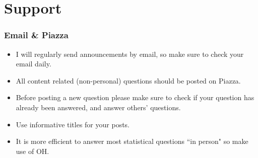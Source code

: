\documentclass[11pt,containsverbatim,handout,xcolor=xelatex,dvipsnames,table]{beamer}
\begin{document}

\section{Support}


\begin{frame}
\frametitle{Email \& Piazza}

\begin{itemize}

\item I will regularly send announcements by email, so make sure to check your email  
daily.

\item All content related (non-personal) questions should be posted on Piazza.

\item Before posting a new question please make sure to check if your question has 
already been answered, and answer others' questions.

\item Use informative titles for your posts.

\item It is more efficient to answer most statistical questions ``in person" so make 
use of OH.

\end{itemize}

\end{frame}

\end{document}
